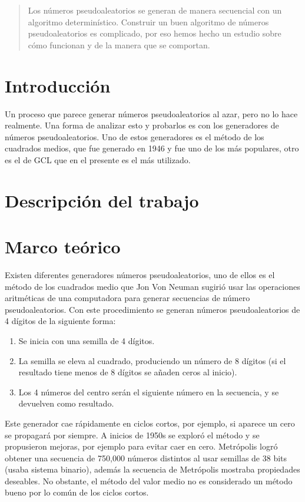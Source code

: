 \begin{abstract}
Los números pseudoaleatorios se generan de manera secuencial con un algoritmo determinístico. Construir un buen algoritmo de números pseudoaleatorios es complicado, por eso hemos hecho un estudio sobre cómo funcionan y de la manera que se comportan.
\end{abstract}




\section{Introducción}
Un proceso que parece generar números pseudoaleatorios al azar, pero no lo hace realmente. Una forma de analizar esto y probarlos es con los generadores de números pseudoaleatorios. Uno de estos generadores es el método de los cuadrados medios, que fue generado en 1946 y fue uno de los más populares, otro es el de GCL que en el presente es el más utilizado.



\section{Descripción del trabajo}



\section{Marco teórico}
Existen diferentes generadores números pseudoaleatorios, uno de ellos es el método de los cuadrados medio que Jon Von Neuman sugirió usar las operaciones aritméticas de una computadora para generar secuencias de número pseudoaleatorios. Con este procedimiento se generan números pseudoaleatorios de 4 dígitos de la siguiente forma:
\begin{enumerate}
    \item Se inicia con una semilla de 4 dígitos.
    \item La semilla se eleva al cuadrado, produciendo un número de 8 dígitos (si el resultado tiene menos de 8 dígitos se añaden ceros al inicio). 
    \item Los 4 números del centro serán el siguiente número en la secuencia, y se devuelven como resultado. 
\end{enumerate}
Este generador cae rápidamente en ciclos cortos, por ejemplo, si aparece un cero se propagará por siempre.
A inicios de 1950s se exploró el método y se propusieron mejoras, por ejemplo para evitar caer en cero. Metrópolis logró obtener una secuencia de 750,000 números distintos al usar semillas de 38 bits (usaba sistema binario), además la secuencia de Metrópolis mostraba propiedades deseables. No obstante, el método del valor medio no es considerado un método bueno por lo común de los ciclos cortos.

